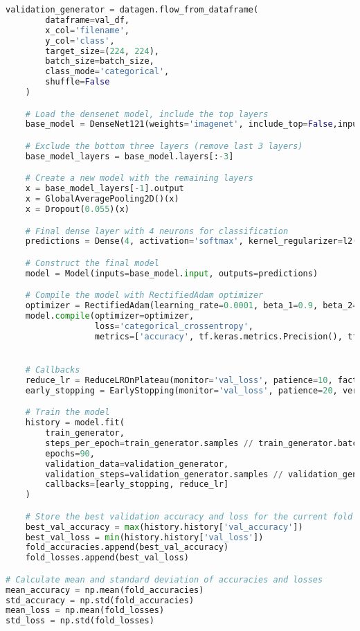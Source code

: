 \begin{lstlisting}[language=Python]
    validation_generator = datagen.flow_from_dataframe(
        dataframe=val_df,
        x_col='filename',
        y_col='class',
        target_size=(224, 224),
        batch_size=batch_size,
        class_mode='categorical',
        shuffle=False
    )

    # Load the densenet model, include the top layers
    base_model = DenseNet121(weights='imagenet', include_top=False,input_shape=(224,224,3))

    # Exclude the bottom three layers (remove last 3 layers)
    base_model_layers = base_model.layers[:-3]

    # Create a new model with the remaining layers
    x = base_model_layers[-1].output
    x = GlobalAveragePooling2D()(x)
    x = Dropout(0.055)(x)

    # Final dense layer with 4 neurons for classification
    predictions = Dense(4, activation='softmax', kernel_regularizer=l2(0.1), dtype='float64')(x)

    # Construct the final model
    model = Model(inputs=base_model.input, outputs=predictions)

    # Compile the model with RectifiedAdam optimizer
    optimizer = RectifiedAdam(learning_rate=0.0001, beta_1=0.9, beta_2=0.999, epsilon=1e-08)
    model.compile(optimizer=optimizer,
                  loss='categorical_crossentropy',
                  metrics=['accuracy', tf.keras.metrics.Precision(), tf.keras.metrics.Recall(), 'categorical_accuracy'])


    # Callbacks
    reduce_lr = ReduceLROnPlateau(monitor='val_loss', patience=10, factor=0.3, min_lr=1e-6, verbose=1)
    early_stopping = EarlyStopping(monitor='val_loss', patience=20, verbose=1, mode='auto')

    # Train the model
    history = model.fit(
        train_generator,
        steps_per_epoch=train_generator.samples // train_generator.batch_size,
        epochs=90,
        validation_data=validation_generator,
        validation_steps=validation_generator.samples // validation_generator.batch_size,
        callbacks=[early_stopping, reduce_lr]
    )

    # Store the best validation accuracy and loss for the current fold
    best_val_accuracy = max(history.history['val_accuracy'])
    best_val_loss = min(history.history['val_loss'])
    fold_accuracies.append(best_val_accuracy)
    fold_losses.append(best_val_loss)

# Calculate mean and standard deviation of accuracies and losses
mean_accuracy = np.mean(fold_accuracies)
std_accuracy = np.std(fold_accuracies)
mean_loss = np.mean(fold_losses)
std_loss = np.std(fold_losses)


\end{lstlisting}
